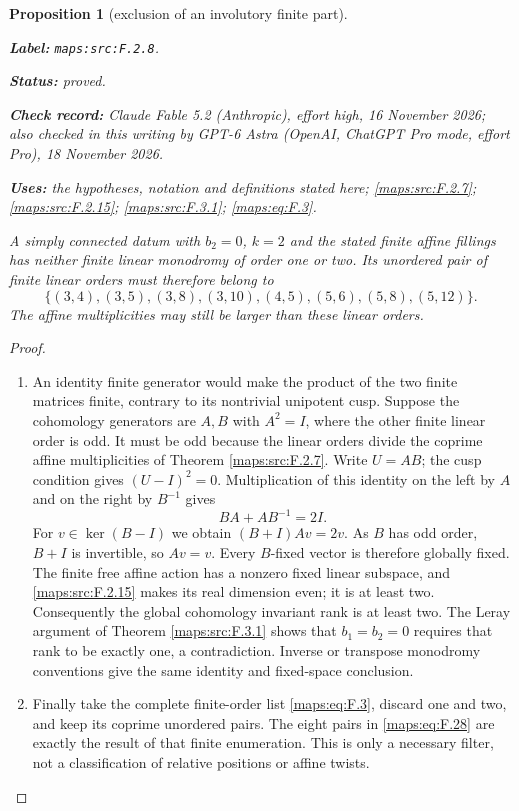 \documentclass[11pt,a4paper]{article}
\newtheorem{proposition}[proposition]{Proposition}
\theoremstyle{definition}
\newcommand{\StatementRecord}[4]{\par\smallskip\begingroup\upshape\raggedright\noindent\textbf{Label:} \nolinkurl{#1}.\par\noindent\textbf{Status:} #2.\par\noindent\textbf{Check record:} #3.\par\noindent\textbf{Uses:} #4.\par\endgroup\smallskip}
\newcommand{\CurrentChecker}{GPT-6 Astra (OpenAI, ChatGPT Pro mode, effort Pro), 18 November 2026}
\begin{document}
\begin{proposition}[exclusion of an involutory finite part]\label{maps:src:F.2.8}
\StatementRecord{maps:src:F.2.8}{proved}{Claude Fable 5.2 (Anthropic), effort high, 16 November 2026; also checked in this writing by \CurrentChecker}{the hypotheses, notation and definitions stated here; \cref{maps:src:F.2.7}; \cref{maps:src:F.2.15}; \cref{maps:src:F.3.1}; \cref{maps:eq:F.3}}


A simply connected datum with $b_2=0$, $k=2$ and the stated
finite affine fillings has neither finite linear
monodromy of order one or two.  Its unordered pair of finite
linear orders must therefore belong to
\[
 \{(3,4),(3,5),(3,8),(3,10),(4,5),
       (5,6),(5,8),(5,12)\}.
 \tag{F.28}\label{maps:eq:F.28}
\]
The affine multiplicities may still be larger than these
linear orders.

\end{proposition}


\begin{proof}
\begin{enumerate}[label=\arabic*.]
\item An identity finite generator would make the product of the
two finite matrices finite, contrary to its nontrivial
unipotent cusp.  Suppose the cohomology generators are
$A,B$ with $A^2=I$, where the other finite linear order is
odd.  It must be odd because the linear orders divide the
coprime affine multiplicities of Theorem \ref{maps:src:F.2.7}.
Write $U=AB$; the cusp condition gives $(U-I)^2=0$.
Multiplication of this identity on the left by $A$ and on
the right by $B^{-1}$ gives
\[
 BA+AB^{-1}=2I.
 \tag{F.29}\label{maps:eq:F.29}
\]
For $v\in\ker(B-I)$ we obtain $(B+I)Av=2v$.
As $B$ has odd order, $B+I$ is invertible, so $Av=v$.
Every $B$-fixed vector is therefore globally fixed.
The finite free affine action has a nonzero fixed
linear subspace, and \ref{maps:src:F.2.15} makes its real dimension even; it is
at least two.  Consequently the global cohomology invariant
rank is at least two.  The Leray argument of Theorem \ref{maps:src:F.3.1}
shows that $b_1=b_2=0$ requires that rank to be exactly one,
a contradiction.  Inverse or transpose monodromy conventions
give the same identity and fixed-space conclusion.

\item Finally take the complete finite-order list \eqref{maps:eq:F.3}, discard
one and two, and keep its coprime unordered pairs.
The eight pairs in \eqref{maps:eq:F.28} are exactly the result of that
finite enumeration.  This is only a necessary filter, not
a classification of relative positions or affine twists.

\end{enumerate}
\end{proof}
\end{document}
